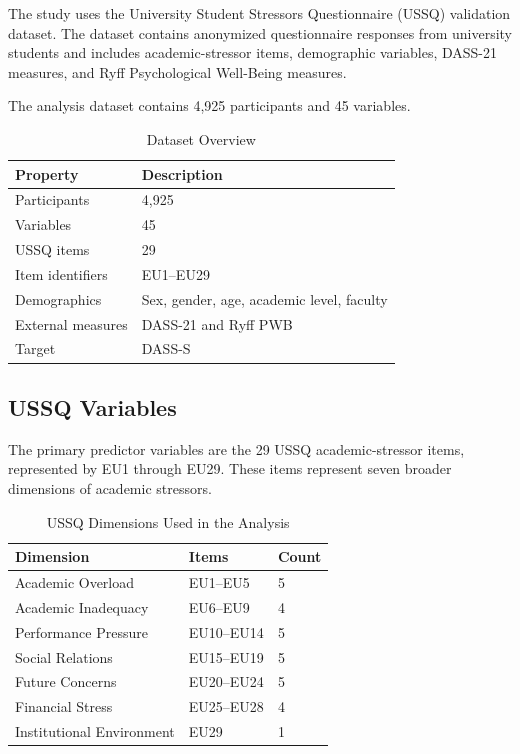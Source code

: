 \documentclass[conference]{IEEEtran}
\begin{document}
The study uses the University Student Stressors Questionnaire (USSQ) validation dataset. The dataset contains anonymized questionnaire responses from university students and includes academic-stressor items, demographic variables, DASS-21 measures, and Ryff Psychological Well-Being measures.

The analysis dataset contains 4,925 participants and 45 variables.

\begin{table}[H]
\centering
\caption{Dataset Overview}
\begin{tabular}{ll}
\toprule
\textbf{Property} & \textbf{Description}\\
\midrule
Participants & 4,925\\
Variables & 45\\
USSQ items & 29\\
Item identifiers & EU1--EU29\\
Demographics & Sex, gender, age, academic level, faculty\\
External measures & DASS-21 and Ryff PWB\\
Target & DASS-S\\
\bottomrule
\end{tabular}
\end{table}

\subsection{USSQ Variables}

The primary predictor variables are the 29 USSQ academic-stressor items, represented by EU1 through EU29. These items represent seven broader dimensions of academic stressors.

\begin{table}[H]
\centering
\caption{USSQ Dimensions Used in the Analysis}
\begin{tabular}{lll}
\toprule
\textbf{Dimension} & \textbf{Items} & \textbf{Count}\\
\midrule
Academic Overload & EU1--EU5 & 5\\
Academic Inadequacy & EU6--EU9 & 4\\
Performance Pressure & EU10--EU14 & 5\\
Social Relations & EU15--EU19 & 5\\
Future Concerns & EU20--EU24 & 5\\
Financial Stress & EU25--EU28 & 4\\
Institutional Environment & EU29 & 1\\
\bottomrule
\end{tabular}
\end{table}
\end{document}
